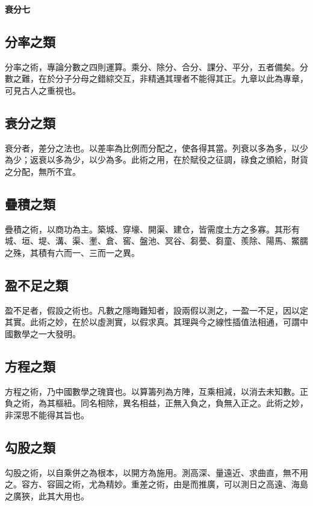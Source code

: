 \documentclass[11pt,a4paper]{article}
\newenvironment{problemenv}[1]{%
  \medskip\noindent\textbf{#1}\par\nopagebreak\smallskip
}{\medskip}
\begin{document}
\begin{problemenv}{衰分七}
\subsection*{分率之類}

分率之術，專論分數之四則運算。乘分、除分、合分、課分、平分，五者備矣。分數之難，在於分子分母之錯綜交互，非精通其理者不能得其正。九章以此為專章，可見古人之重視也。

\subsection*{衰分之類}

衰分者，差分之法也。以差率為比例而分配之，使各得其當。列衰以多為多，以少為少；返衰以多為少，以少為多。此術之用，在於賦役之征調，祿食之頒給，財貨之分配，無所不宜。

\subsection*{疊積之類}

疊積之術，以商功為主。築城、穿壕、開渠、建仓，皆需度土方之多寡。其形有城、垣、堤、溝、渠、壍、倉、窖、盤池、冥谷、芻甍、芻童、羨除、陽馬、鱉臑之殊，其積有六而一、三而一之異。

\subsection*{盈不足之類}

盈不足者，假設之術也。凡數之隱晦難知者，設兩假以測之，一盈一不足，因以定其實。此術之妙，在於以虛測實，以假求真。其理與今之線性插值法相通，可謂中國數學之一大發明。

\subsection*{方程之類}

方程之術，乃中國數學之瑰寶也。以算籌列為方陣，互乘相減，以消去未知數。正負之術，為其樞紐。同名相除，異名相益，正無入負之，負無入正之。此術之妙，非深思不能得其旨也。

\subsection*{勾股之類}

勾股之術，以自乘併之為根本，以開方為施用。測高深、量遠近、求曲直，無不用之。容方、容圓之術，尤為精妙。重差之術，由是而推廣，可以測日之高遠、海島之廣狹，此其大用也。

\newpage


\end{problemenv}
\end{document}
